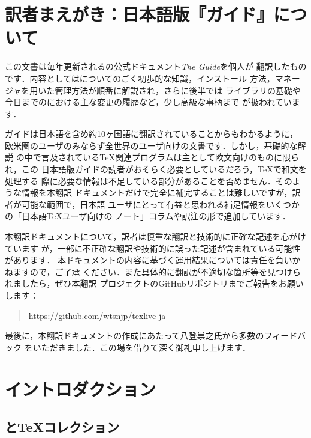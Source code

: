\documentclass[uplatex,dvipdfmx,tombow]{jsarticle}
\date{2022年3月}
\begin{document}
\maketitle
\thispagestyle{empty}

\tableofcontents

\section*{訳者まえがき：日本語版『\TL ガイド』について}

この文書は毎年更新される\TL の公式ドキュメント\textsl{The {\TL} Guide}を個人が
翻訳したものです．内容としては\TL についてのごく初歩的な知識，インストール
方法，\TL マネージャを用いた\TL 管理方法が順番に解説され，さらに後半では\KPS
ライブラリの基礎や今日までの\TL における主な変更の履歴など，少し高級な事柄まで
が扱われています．

\TL ガイドは日本語を含め約10ヶ国語に翻訳されていることからもわかるように，
欧米圏のユーザのみならず全世界の\TL ユーザ向けの文書です．しかし，基礎的な解説
の中で言及されている\TeX 関連プログラムは主として欧文向けのものに限られ，この
日本語版\TL ガイドの読者がおそらく必要としているだろう，\TeX で和文を処理する
際に必要な情報は不足している部分があることを否めません．そのような情報を本翻訳
ドキュメントだけで完全に補完することは難しいですが，訳者が可能な範囲で，日本語
ユーザにとって有益と思われる補足情報をいくつかの「日本語\TeX ユーザ向けの
ノート」コラムや訳注の形で追加しています．

本翻訳ドキュメントについて，訳者は慎重な翻訳と技術的に正確な記述を心がけています
が，一部に不正確な翻訳や技術的に誤った記述が含まれている可能性があります．
本ドキュメントの内容に基づく運用結果については責任を負いかねますので，ご了承
ください．また具体的に翻訳が不適切な箇所等を見つけられましたら，ぜひ本翻訳
プロジェクトのGitHubリポジトリまでご報告をお願いします：
%
\begin{quote}
\url{https://github.com/wtsnjp/texlive-ja}
\end{quote}

最後に，本翻訳ドキュメントの作成にあたって八登祟之氏から多数のフィードバック
をいただきました．この場を借りて深く御礼申し上げます．

\section{イントロダクション}\label{sec:intro}

\subsection{\TL と\TeX コレクション}
\end{document}
